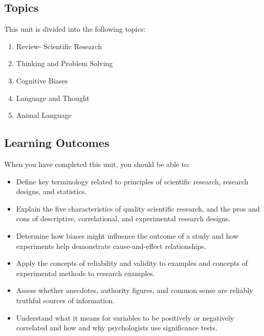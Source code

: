 \documentclass[
]{book}
\providecommand{\tightlist}{%
  \setlength{\itemsep}{0pt}\setlength{\parskip}{0pt}}
\begin{document}
\hypertarget{topics}{%
\subsection*{Topics}\label{topics}}

This unit is divided into the following topics:

\begin{enumerate}
\def\labelenumi{\arabic{enumi}.}
\tightlist
\item
  Review- Scientific Research\\
\item
  Thinking and Problem Solving\\
\item
  Cognitive Biases\\
\item
  Language and Thought\\
\item
  Animal Language
\end{enumerate}

\hypertarget{learning-outcomes}{%
\subsection*{Learning Outcomes}\label{learning-outcomes}}

When you have completed this unit, you should be able to:

\begin{itemize}
\tightlist
\item
  Define key terminology related to principles of scientific research, research designs, and statistics.\\
\item
  Explain the five characteristics of quality scientific research, and the pros and cons of descriptive, correlational, and experimental research designs.\\
\item
  Determine how biases might influence the outcome of a study and how experiments help demonstrate cause-and-effect relationships.\\
\item
  Apply the concepts of reliability and validity to examples and concepts of experimental methods to research examples.\\
\item
  Assess whether anecdotes, authority figures, and common sense are reliably truthful sources of information.\\
\item
  Understand what it means for variables to be positively or negatively correlated and how and why psychologists use significance tests.
\end{itemize}
\end{document}
